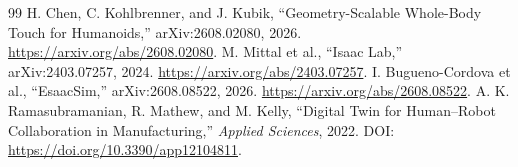 \documentclass[10pt,a4paper]{article}
\begin{document}
\begin{thebibliography}{99}
 H. Chen, C. Kohlbrenner, and J. Kubik, ``Geometry-Scalable Whole-Body Touch for Humanoids,'' arXiv:2608.02080, 2026. \url{https://arxiv.org/abs/2608.02080}.
 M. Mittal et al., ``Isaac Lab,'' arXiv:2403.07257, 2024. \url{https://arxiv.org/abs/2403.07257}.
 I. Bugueno-Cordova et al., ``EsaacSim,'' arXiv:2608.08522, 2026. \url{https://arxiv.org/abs/2608.08522}.
 A. K. Ramasubramanian, R. Mathew, and M. Kelly, ``Digital Twin for Human--Robot Collaboration in Manufacturing,'' \emph{Applied Sciences}, 2022. DOI: \url{https://doi.org/10.3390/app12104811}.
\end{thebibliography}
\end{document}
